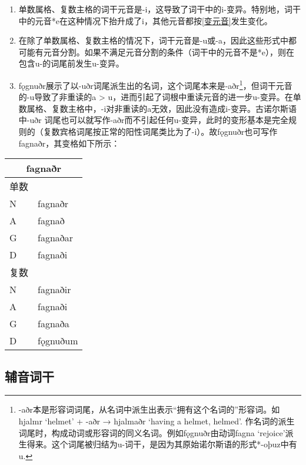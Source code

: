 \begin{enumerate}
  \def\labelenumi{\arabic{enumi})}
  \item
        单数属格、复数主格的词干元音是-i，这导致了词干中的i-变异。特别地，词干中的元音*e在这种情况下抬升成了i，其他元音都按\ref{变元音}发生变化。
  \item
        在除了单数属格、复数主格的情况下，词干元音是-u或-a，因此这些形式中都可能有元音分割。如果不满足元音分割的条件（词干中的元音不是*e），则在包含u-的词尾前发生u-变异。
  \item
        fǫgnuðr展示了以-uðr词尾派生出的名词，这个词尾本来是-aðr\footnote{-aðr本是形容词词尾，从名词中派生出表示``拥有这个名词的''形容词。如hjalmr
          `helmet' + -aðr → hjalmaðr `having a helmet, helmed'.
          作名词的派生词尾时，构成动词或形容词的同义名词。例如fǫgnuðr由动词fagna
          `rejoice'派生得来。这个词尾被归结为u-词干，是因为其原始诺尔斯语的形式*-oþuz中有u.}，但词干元音的-u导致了非重读的a
        \textgreater{}
        u，进而引起了词根中重读元音的进一步u-变异。在单数属格、复数主格中，-i对非重读的a无效，因此没有造成i-变异。古诺尔斯语中-uðr
        词尾也可以就写作-aðr而不引起任何u-变异，此时的变形基本是完全规则的（复数宾格词尾按正常的阳性词尾类比为了-i）。故fǫgnuðr也可写作fagnaðr，其变格如下所示：
\end{enumerate}

\begin{longtable}{ll}
  \toprule
  \multicolumn{2}{c}{fagnaðr} \\
  \midrule
  \endhead
  \bottomrule
  \endfoot
  单数 &                      \\
  N    & fagnaðr              \\
  A    & fagnað               \\
  G    & fagnaðar             \\
  D    & fagnaði              \\
  复数 &                      \\
  N    & fagnaðir             \\
  A    & fagnaði              \\
  G    & fagnaða              \\
  D    & fǫgnuðum             \\
\end{longtable}

\subsection{辅音词干}\label{辅音词干}

